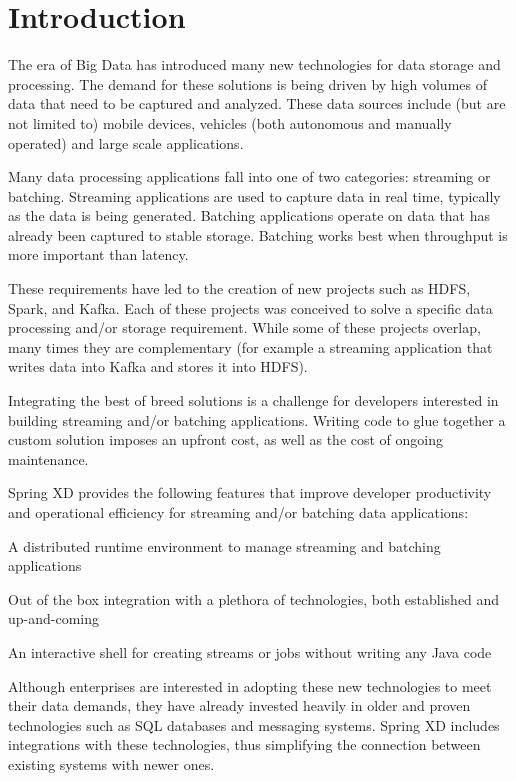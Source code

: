 \section{Introduction}

The era of Big Data has introduced many new technologies for data storage
and processing. The demand for these solutions is being driven by high
volumes of data that need to be captured and analyzed. These data sources
include (but are not limited to) mobile devices, vehicles (both autonomous
and manually operated) and large scale applications.

Many data processing applications fall into one of two categories:
streaming or batching. Streaming applications are used to capture data
in real time, typically as the data is being generated. Batching applications
operate on data that has already been captured to stable storage. Batching
works best when throughput is more important than latency.

These requirements have led to the creation of new projects such as HDFS\cite{hdfs},
Spark\cite{spark}, and Kafka\cite{kafka}. Each of these projects was conceived
to solve a specific data processing and/or storage requirement. While some
of these projects overlap, many times they are complementary (for example
a streaming application that writes data into Kafka and stores it into HDFS).

Integrating the best of breed solutions is a challenge for developers
interested in building streaming and/or batching applications. Writing
code to glue together a custom solution imposes an upfront cost,
as well as the cost of ongoing maintenance.

Spring XD provides the following features that improve developer
productivity and operational efficiency for streaming and/or batching
data applications:
\begin{itemize*}
\item A distributed runtime environment to manage streaming and batching applications
\item Out of the box integration with a plethora of technologies, both established
and up-and-coming
\item An interactive shell for creating streams or jobs without writing any Java code
\end{itemize*}

Although enterprises are interested in adopting these new technologies to
meet their data demands, they have already invested heavily in older and proven
technologies such as SQL databases and messaging systems. Spring XD includes
integrations with these technologies, thus simplifying the connection between
existing systems with newer ones.

